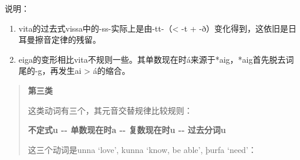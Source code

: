 说明：

\begin{enumerate}
  \def\labelenumi{\arabic{enumi})}
  \item
        vita的过去式vissa中的-ss-实际上是由-tt-（\textless{} -t +
        -ð）变化得到，这依旧是日耳曼擦音定律的残留。
  \item
        eiga的变形相比vita不规则一些。其单数现在时á来源于*aig，*aig首先脱去词尾的-g，再发生ai
        \textgreater{} á的缩合。
\end{enumerate}

\begin{quote}
  \textbf{第三类}

  这类动词有三个，其元音交替规律比较规则：

  \textbf{不定式u -\/- 单数现在时a -\/- 复数现在时u -\/- 过去分词u}

  这三个动词是unna `love‌', kunna `know, be able‌', þurfa `need‌'：
\end{quote}


